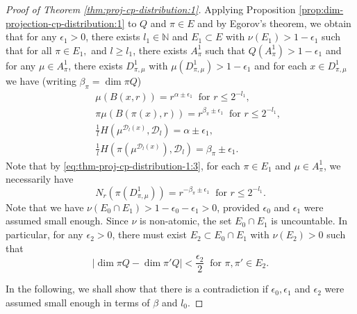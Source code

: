 \documentclass[10pt,a4paper]{amsart}
\def\D{\mathcal{D}}
\def\N{\mathbb N}
\begin{document}
\begin{proof}[Proof of Theorem \ref{thm:proj-cp-distribution:1}]
Applying Proposition \ref{prop:dim-projection-cp-distribution:1} to $Q$ and $\pi\in E$ and by Egorov's theorem,  we obtain that for any $\epsilon_1>0$,  there exists $l_1\in \N$ and $E_1\subset E$ with $\nu(E_1)>1-\epsilon_1$ such that for all  $\pi\in E_1,$ and  $l\ge l_1$, there exists $A_\pi^1$ such that $Q(A_\pi^1)>1-\epsilon_1$ and for any $\mu\in A_\pi^1$, there exists $D_{\pi,\mu}^1$ with $\mu(D_{\pi,\mu}^1)>1-\epsilon_1$ and for each $x\in D_{\pi,\mu}^1$ we have (writing $\beta_\pi=\dim \pi Q$)
\begin{eqnarray}
 & & \mu(B(x,r))= r^{\alpha\pm \epsilon_1} \  \textrm{ for }  r\le 2^{-l_1},  \label{eq:thm-proj-cp-distribution-1:2}\\
& & \pi\mu(B(\pi(x),r)) = r^{\beta_\pi\pm \epsilon_1} \  \textrm{ for } r\le 2^{-l_1}, \label{eq:thm-proj-cp-distribution-1:3}\\
& & \frac{1}{l}H\left(\mu^{\D_l(x)},\D_l\right) = \alpha\pm \epsilon_1,\label{eq:thm-proj-cp-distribution-1:4}\\
& & \frac{1}{l}H\left(\pi\left(\mu^{\D_l(x)}\right),\D_l\right) = \beta_\pi\pm \epsilon_1. \label{eq:thm-proj-cp-distribution-1:5}
\end{eqnarray}
Note that by \eqref{eq:thm-proj-cp-distribution-1:3},  for each $\pi\in E_1$ and $\mu\in A_{\pi}^1$, we necessarily have
\begin{equation}\label{eq:thm-proj-cp-distribution-1:6}
N_{r}(\pi(D_{\pi,\mu}^1)) = r^{-\beta_\pi\pm \epsilon_1} \ \textrm{ for } r\le 2^{-l_1}.
\end{equation}
Note that we have $\nu(E_0\cap E_1)>1-\epsilon_0-\epsilon_1>0$, provided $\epsilon_0$ and $\epsilon_1$ were assumed small enough.  Since $\nu$ is non-atomic, the set $E_0\cap E_1$ is uncountable. In particular,  for any $\epsilon_2>0$,   there must exist $E_2\subset E_0\cap E_1$ with $\nu(E_2)>0$ such that 
 \begin{equation}\label{eq:thm-proj-cp-distribution-1:7}
|\dim \pi Q-\dim \pi' Q | <\frac{\epsilon_2}{2} \ \textrm{ for }\pi,\pi'\in E_2.
\end{equation}

In the following, we shall show that there is a contradiction if $\epsilon_0,\epsilon_1$ and $\epsilon_2$ were assumed  small enough in terms of $\beta$ and $l_0$. 


\end{proof}
\end{document}
